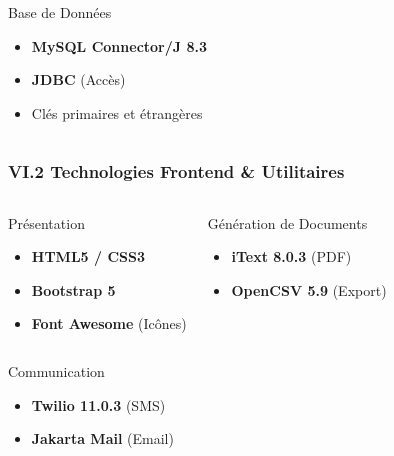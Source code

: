 \documentclass[11pt, aspectratio=169]{beamer}
\begin{document}
\begin{frame}
\begin{columns}[T]
        \begin{block}{Base de Données}
            \begin{itemize}
                \item[\faDatabase] \textbf{MySQL Connector/J 8.3}
                \item[\faCodeBranch] \textbf{JDBC} (Accès)
                \item[\faKey] Clés primaires et étrangères
            \end{itemize}
        \end{block}
    \end{columns}
\end{frame}

\begin{frame}
    \frametitle{VI.2 Technologies Frontend \& Utilitaires}
    
    \begin{columns}[T]
        \begin{block}{Présentation}
            \begin{itemize}
                \item[\faFileCode] \textbf{HTML5 / CSS3}
                \item[\faCheckSquare] \textbf{Bootstrap 5}
                \item[\faGithub] \textbf{Font Awesome} (Icônes)
            \end{itemize}
        \end{block}
        
        \begin{block}{Génération de Documents}
            \begin{itemize}
                \item[\faPDF] \textbf{iText 8.0.3} (PDF)
                \item[\faFileCsv] \textbf{OpenCSV 5.9} (Export)
            \end{itemize}
        \end{block}
    \end{columns}
    
    \vspace{1cm}
    
    \begin{columns}[T]
        \begin{block}{Communication}
            \begin{itemize}
                \item[\faSms] \textbf{Twilio 11.0.3} (SMS)
                \item[\faEnvelope] \textbf{Jakarta Mail} (Email)
            \end{itemize}
        \end{block}
        

\end{columns}
\end{frame}
\end{document}
